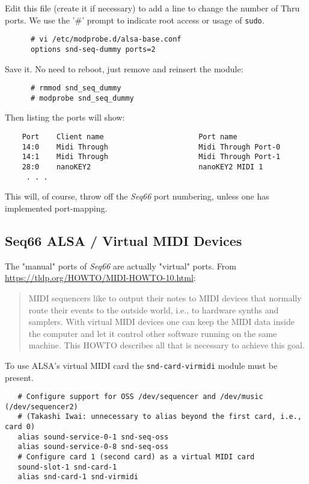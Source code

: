    Edit this file (create it if necessary) to add a line to change the number
   of Thru ports.  We use the '\#' prompt to indicate root access or usage of
   \texttt{sudo}.

   \begin{verbatim}
      # vi /etc/modprobe.d/alsa-base.conf
      options snd-seq-dummy ports=2
   \end{verbatim}

   Save it.  No need to reboot, just remove and reinsert the module:

   \begin{verbatim}
      # rmmod snd_seq_dummy
      # modprobe snd_seq_dummy
   \end{verbatim}

   Then listing the ports will show:

   \begin{verbatim}
    Port    Client name                      Port name
    14:0    Midi Through                     Midi Through Port-0
    14:1    Midi Through                     Midi Through Port-1
    28:0    nanoKEY2                         nanoKEY2 MIDI 1
     . . .
   \end{verbatim}

   This will, of course, throw off the \textsl{Seq66} port numbering, unless
   one has implemented port-mapping.

\subsection{Seq66 ALSA / Virtual MIDI Devices}
\label{subsec:alsa_virtual_midi_devices}

   The "manual" ports of \textsl{Seq66} are actually "virtual" ports.
   From \url{https://tldp.org/HOWTO/MIDI-HOWTO-10.html}:

   \begin{quote}
   MIDI sequencers like to output their notes to MIDI devices that normally
   route their events to the outside world, i.e., to hardware synths and
   samplers. With virtual MIDI devices one can keep the MIDI data inside the
   computer and let it control other software running on the same machine. This
   HOWTO describes all that is necessary to achieve this goal.
   \end{quote}

   To use ALSA's virtual MIDI card the
   \texttt{snd-card-virmidi} module must be present. 

   \begin{verbatim}
   # Configure support for OSS /dev/sequencer and /dev/music (/dev/sequencer2)
   # (Takashi Iwai: unnecessary to alias beyond the first card, i.e., card 0)
   alias sound-service-0-1 snd-seq-oss
   alias sound-service-0-8 snd-seq-oss
   # Configure card 1 (second card) as a virtual MIDI card
   sound-slot-1 snd-card-1
   alias snd-card-1 snd-virmidi
   \end{verbatim}

